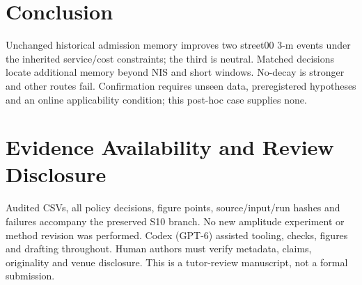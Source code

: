 \documentclass[conference]{IEEEtran}
\begin{document}
\section{Conclusion}
Unchanged historical admission memory improves two street00 3-m events under the inherited service/cost constraints; the third is neutral. Matched decisions locate additional memory beyond NIS and short windows. No-decay is stronger and other routes fail. Confirmation requires unseen data, preregistered hypotheses and an online applicability condition; this post-hoc case supplies none.

\section*{Evidence Availability and Review Disclosure}
Audited CSVs, all policy decisions, figure points, source/input/run hashes and failures accompany the preserved S10 branch. No new amplitude experiment or method revision was performed. Codex (GPT-6) assisted tooling, checks, figures and drafting throughout. Human authors must verify metadata, claims, originality and venue disclosure. This is a tutor-review manuscript, not a formal submission.



\end{document}
